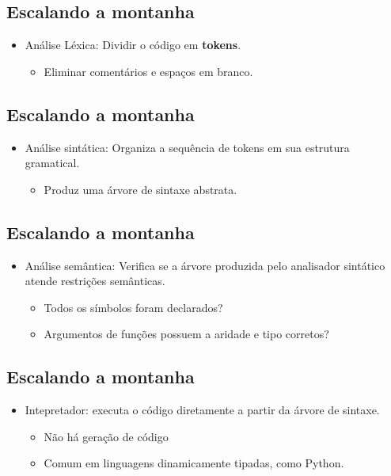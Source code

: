 \documentclass[11pt]{article}
\begin{document}
\subsection*{Escalando a montanha}
\label{sec:orga0adf02}

\begin{itemize}
\item Análise Léxica: Dividir o código em \textbf{\textbf{tokens}}.
\begin{itemize}
\item Eliminar comentários e espaços em branco.
\end{itemize}
\end{itemize}
\subsection*{Escalando a montanha}
\label{sec:org74ab40b}

\begin{itemize}
\item Análise sintática: Organiza a sequência de tokens em sua estrutura gramatical.
\begin{itemize}
\item Produz uma árvore de sintaxe abstrata.
\end{itemize}
\end{itemize}
\subsection*{Escalando a montanha}
\label{sec:org1f058f2}

\begin{itemize}
\item Análise semântica: Verifica se a árvore produzida pelo analisador sintático atende restrições semânticas.
\begin{itemize}
\item Todos os símbolos foram declarados?
\item Argumentos de funções possuem a aridade e tipo corretos?
\end{itemize}
\end{itemize}
\subsection*{Escalando a montanha}
\label{sec:orgb614a0c}

\begin{itemize}
\item Intepretador: executa o código diretamente a partir da árvore de sintaxe.
\begin{itemize}
\item Não há geração de código
\item Comum em linguagens dinamicamente tipadas, como Python.
\end{itemize}
\end{itemize}
\end{document}

